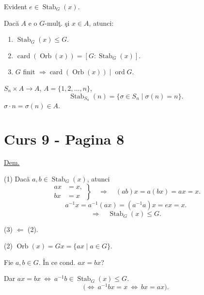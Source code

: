 \noindent Evident $e\in\operatorname{Stab}_G(x)$.

\bigskip
\noindent{} Dacă $A$ e o $G$-mulţ. şi $x\in A$, atunci:
\begin{enumerate}
\item[(1)] $\operatorname{Stab}_G(x)\leq G$.
\item[(2)] $\operatorname{card}(\operatorname{Orb}(x))
=[G:\operatorname{Stab}_G(x)]$.
\item[(3)] $G$ finit $\Longrightarrow\operatorname{card}(\operatorname{Orb}(x))\mid\operatorname{ord}G$.
\end{enumerate}

\bigskip
\noindent $S_n\times A\longrightarrow A$, \qquad $A=\{1,2,\ldots,n\}$,
\[
\operatorname{Stab}_{S_n}(n)
=\{\sigma\in S_n\mid\sigma(n)=n\}.
\]
\noindent $\sigma\cdot n=\sigma(n)\in A$.



\bigskip

\section*{Curs 9 - Pagina 8}


\noindent\underline{Dem.}

\bigskip
\noindent (1) Dacă $a,b\in\operatorname{Stab}_G(x)$, atunci
\[
\left.\begin{aligned}
 ax&=x,\\
 bx&=x
\end{aligned}\right\}
\quad\Longrightarrow\quad (ab)x=a(bx)=ax=x.
\]
\[
a^{-1}x=a^{-1}(ax)=(a^{-1}a)x=ex=x.
\]
\[
\Longrightarrow\quad \operatorname{Stab}_G(x)\leq G.
\]

\bigskip
\noindent (3) $\Longleftarrow$ (2).

\bigskip
\noindent (2) $\operatorname{Orb}(x)=Gx=\{ax\mid a\in G\}$.

\bigskip
\noindent Fie $a,b\in G$. În ce cond. $ax=bx$?

\bigskip
\noindent Dar $ax=bx\ \Longleftrightarrow\ a^{-1}b\in\operatorname{Stab}_G(x)\leq G$.
\[
\big(\Longleftrightarrow\ a^{-1}bx=x\ \Longleftrightarrow\ bx=ax\big).
\]
